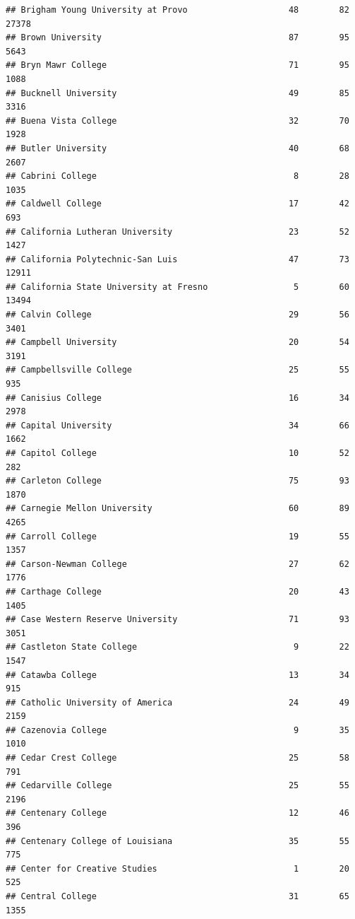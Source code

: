 \documentclass[
]{article}
\begin{document}
\begin{verbatim}
## Brigham Young University at Provo                    48        82       27378
## Brown University                                     87        95        5643
## Bryn Mawr College                                    71        95        1088
## Bucknell University                                  49        85        3316
## Buena Vista College                                  32        70        1928
## Butler University                                    40        68        2607
## Cabrini College                                       8        28        1035
## Caldwell College                                     17        42         693
## California Lutheran University                       23        52        1427
## California Polytechnic-San Luis                      47        73       12911
## California State University at Fresno                 5        60       13494
## Calvin College                                       29        56        3401
## Campbell University                                  20        54        3191
## Campbellsville College                               25        55         935
## Canisius College                                     16        34        2978
## Capital University                                   34        66        1662
## Capitol College                                      10        52         282
## Carleton College                                     75        93        1870
## Carnegie Mellon University                           60        89        4265
## Carroll College                                      19        55        1357
## Carson-Newman College                                27        62        1776
## Carthage College                                     20        43        1405
## Case Western Reserve University                      71        93        3051
## Castleton State College                               9        22        1547
## Catawba College                                      13        34         915
## Catholic University of America                       24        49        2159
## Cazenovia College                                     9        35        1010
## Cedar Crest College                                  25        58         791
## Cedarville College                                   25        55        2196
## Centenary College                                    12        46         396
## Centenary College of Louisiana                       35        55         775
## Center for Creative Studies                           1        20         525
## Central College                                      31        65        1355

\end{verbatim}
\end{document}
